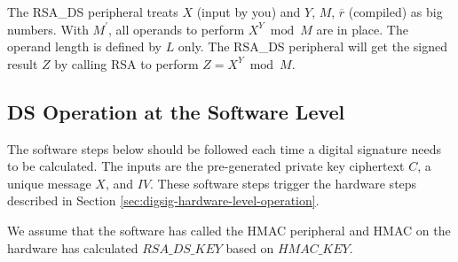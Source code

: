 \documentclass[main\_\_EN.tex]{subfiles}
\begin{document}
\begin{enumerate}
        The RSA\_DS peripheral treats \begin{math}X\end{math} (input by you) and \begin{math}Y\end{math}, \begin{math}M\end{math}, \begin{math}\overline{r}\end{math} (compiled) as big numbers. With \begin{math}M^{\prime}\end{math}, all operands to perform \begin{math} X^{Y} \bmod M\end{math} are in place. The operand length is defined by \begin{math}L\end{math} only. The RSA\_DS peripheral will get the signed result \begin{math}Z\end{math} by calling RSA to perform \begin{math}Z = X^{Y} \bmod M\end{math}.

\end{enumerate}

\subsection{DS Operation at the Software Level}

The software steps below should be followed each time a digital signature needs to be calculated. The inputs are the pre-generated private key ciphertext \begin{math}C\end{math}, a unique message \begin{math}X\end{math}, and \begin{math}IV\end{math}. These software steps trigger the hardware steps described in Section \ref{sec:digsig-hardware-level-operation}.

We assume that the software has called the HMAC peripheral and HMAC on the hardware has calculated \begin{math}RSA\_DS\_KEY\end{math} based on \begin{math}HMAC\_KEY\end{math}.
\end{document}
